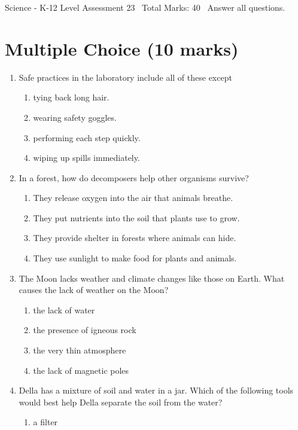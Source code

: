 \documentclass[12pt]{article}
\begin{document}
\begin{center}
Science - K-12 Level Assessment 23 \
Total Marks: 40 \
Answer all questions.
\end{center}

\section*{Multiple Choice (10 marks)}
\begin{enumerate}[label=\arabic*.]
\item Safe practices in the laboratory include all of these except
\begin{enumerate}[label=(\alph*)]
    \item tying back long hair.
    \item wearing safety goggles.
    \item performing each step quickly.
    \item wiping up spills immediately.
\end{enumerate}
\item In a forest, how do decomposers help other organisms survive?
\begin{enumerate}[label=(\alph*)]
    \item They release oxygen into the air that animals breathe.
    \item They put nutrients into the soil that plants use to grow.
    \item They provide shelter in forests where animals can hide.
    \item They use sunlight to make food for plants and animals.
\end{enumerate}
\item The Moon lacks weather and climate changes like those on Earth. What causes the lack of weather on the Moon?
\begin{enumerate}[label=(\alph*)]
    \item the lack of water
    \item the presence of igneous rock
    \item the very thin atmosphere
    \item the lack of magnetic poles
\end{enumerate}
\item Della has a mixture of soil and water in a jar. Which of the following tools would best help Della separate the soil from the water?
\begin{enumerate}[label=(\alph*)]
    \item a filter

\end{enumerate}
\end{enumerate}
\end{document}
